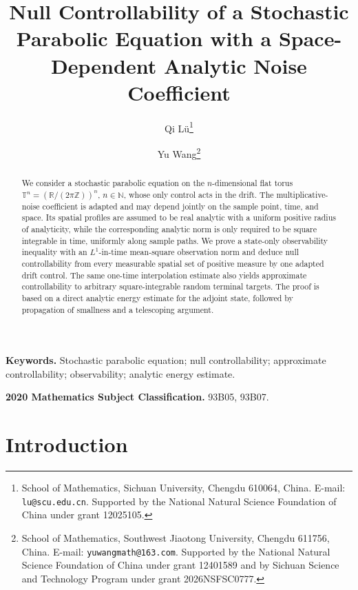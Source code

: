 \documentclass[print,wide]{draft}
\begin{document}
\title{Null Controllability of a Stochastic Parabolic Equation with a Space-Dependent Analytic Noise Coefficient}

\author{Qi L\"u\thanks{School of Mathematics, Sichuan University, Chengdu 610064, China. E-mail: \texttt{lu@scu.edu.cn}. Supported by the National Natural Science Foundation of China under grant 12025105.}
\and
Yu Wang\thanks{School of Mathematics, Southwest Jiaotong University, Chengdu 611756, China. E-mail: \texttt{yuwangmath@163.com}. Supported by the National Natural Science Foundation of China under grant 12401589 and by Sichuan Science and Technology Program under grant 2026NSFSC0777.}}

\date{}
\maketitle

\begin{abstract}
We consider a stochastic parabolic equation on the $n$-dimensional flat torus
$\mathbb{T}^n=(\mathbb{R}/(2\pi\mathbb Z))^n$, $n\in\mathbb N$, whose only control acts in the
drift.  The multiplicative-noise coefficient is
adapted and may depend jointly on the sample point, time, and space.  Its
spatial profiles are assumed to be real analytic with a uniform positive
radius of analyticity, while the corresponding analytic norm is only required
to be square integrable in time, uniformly along sample paths.  We prove a
state-only observability inequality with an $L^1$-in-time mean-square
observation norm and deduce null controllability from every measurable spatial
set of positive measure by one adapted drift control.  The same one-time interpolation
estimate also yields approximate controllability to arbitrary square-integrable
random terminal targets.  The proof is based on a direct analytic
energy estimate for the adjoint state, followed by propagation of smallness
and a telescoping argument.
\end{abstract}

\medskip
\noindent\textbf{Keywords.}
Stochastic parabolic equation; null controllability;  
approximate controllability; observability; analytic energy estimate.

\medskip
\noindent\textbf{2020 Mathematics Subject Classification.}
93B05, 93B07.

\section{Introduction}\label{sec:introduction}
\end{document}
